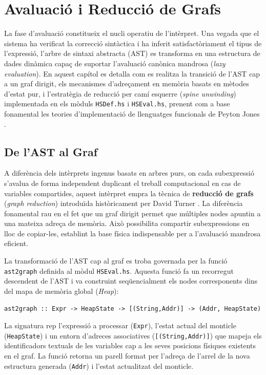 \chapter{Avaluació i Reducció de Grafs}

La fase d'avaluació constitueix el nucli operatiu de l'intèrpret. Una vegada que el sistema ha verificat la correcció sintàctica i ha inferit satisfactòriament el tipus de l'expressió, l'arbre de sintaxi abstracta (AST) es transforma en una estructura de dades dinàmica capaç de suportar l'avaluació canònica mandrosa (\textit{lazy evaluation}). En aquest capítol es detalla com es realitza la transició de l'AST cap a un graf dirigit, els mecanismes d'adreçament en memòria basats en mètodes d'estat pur, i l'estratègia de reducció per camí esquerre (\textit{spine unwinding}) implementada en els mòduls \texttt{HSDef.hs} i \texttt{HSEval.hs}, prenent com a base fonamental les teories d'implementació de llenguatges funcionals de Peyton Jones \cite{peyton1987implementation}.

\section{De l'AST al Graf}

A diferència dels intèrprets ingenus basats en arbres purs, on cada subexpressió s'avalua de forma independent duplicant el treball computacional en cas de variables compartides, aquest intèrpret empra la tècnica de \textbf{reducció de grafs} (\textit{graph reduction}) introduïda històricament per David Turner \cite{turner1979new}. La diferència fonamental rau en el fet que un graf dirigit permet que múltiples nodes apuntin a una mateixa adreça de memòria. Això possibilita compartir subexpressions en lloc de copiar-les, establint la base física indispensable per a l'avaluació mandrosa eficient.

La transformació de l'AST cap al graf es troba governada per la funció \texttt{ast2graph} definida al mòdul \texttt{HSEval.hs}. Aquesta funció fa un recorregut descendent de l'AST i va construint seqüencialment els nodes corresponents dins del mapa de memòria global (\textit{Heap}):

\begin{lstlisting}[style=haskellstyle, caption=Funció de transformació de l'AST al graf elemental]
ast2graph :: Expr -> HeapState -> [(String,Addr)] -> (Addr, HeapState)
\end{lstlisting}

La signatura rep l'expressió a processar (\texttt{Expr}), l'estat actual del monticle (\texttt{HeapState}) i un entorn d'adreces associatives (\texttt{[(String,Addr)]}) que mapeja els identificadors textuals de les variables cap a les seves posicions físiques existents en el graf. La funció retorna un parell format per l'adreça de l'arrel de la nova estructura generada (\texttt{Addr}) i l'estat actualitzat del monticle.

